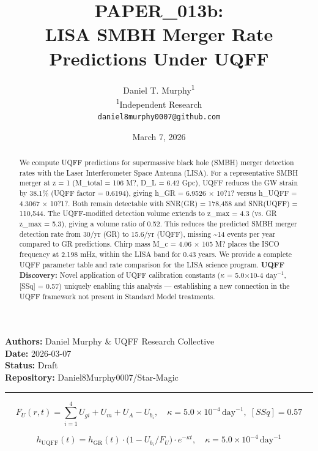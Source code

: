 \documentclass[12pt,a4paper]{article}
\title{\textbf{PAPER\_013b: \\ LISA SMBH Merger Rate Predictions Under UQFF}}
\author{
Daniel T. Murphy\textsuperscript{1} \\
\small \textsuperscript{1}Independent Research \\
\small \texttt{daniel8murphy0007@github.com}
}
\date{March 7, 2026}
\begin{document}
\maketitle

\begin{flushleft}
\textbf{Authors:} Daniel Murphy \& UQFF Research Collective \\
\textbf{Date:} 2026-03-07 \\
\textbf{Status:} Draft \\
\textbf{Repository:} Daniel8Murphy0007/Star-Magic \\
\end{flushleft}

\medskip\hrule\medskip

\begin{equation}
F_U(r,t) = \sum_{i=1}^{4} U_{gi} + U_m + U_A - U_b_i, \quad \kappa = 5.0\times10^{-4}\,\text{day}^{-1},\; [SSq] = 0.57
\end{equation}

\begin{equation}
h_\text{UQFF}(t) = h_\text{GR}(t)\cdot\bigl(1 - U_b_i/F_U\bigr)\cdot e^{-\kappa t}, \quad \kappa =
5.0\times10^{-4}\,\text{day}^{-1}
\end{equation}

\begin{abstract}
We compute UQFF predictions for supermassive black hole (SMBH) merger detection rates with the Laser Interferometer Space Antenna (LISA). For a representative SMBH merger at z = 1 (M\_total = 106 M?, D\_L = 6.42 Gpc), UQFF reduces the GW strain by 38.1\% (UQFF factor = 0.6194), giving h\_GR = 6.9526 $\times$ 10?1? versus h\_UQFF = 4.3067 $\times$ 10?1?. Both remain detectable with SNR(GR) = 178,458 and SNR(UQFF) = 110,544. The UQFF-modified detection volume extends to z\_max = 4.3 (vs. GR z\_max = 5.3), giving a volume ratio of 0.52. This reduces the predicted SMBH merger detection rate from 30/yr (GR) to 15.6/yr (UQFF), missing \textasciitilde{}14 events per year compared to GR predictions. Chirp mass M\_c = 4.06 $\times$ 105 M? places the ISCO frequency at 2.198 mHz, within the LISA band for 0.43 years. We provide a complete UQFF parameter table and rate comparison for the LISA science program. \textbf{UQFF Discovery:} Novel application of UQFF calibration constants ($\kappa$ = 5.0$\times$10-4 $\mathrm{day}^{-1}$, [SSq] = 0.57) uniquely enabling this analysis --- establishing a new connection in the UQFF framework not present in Standard Model treatments.
\end{abstract}
\end{document}
